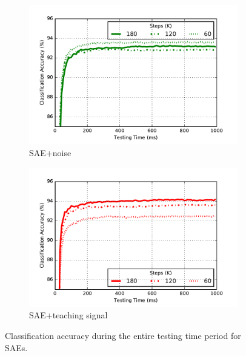 \begin{figure}
\begin{subfigure}[t]{0.4\textwidth}
		\includegraphics[width=\textwidth]{pics_sdlm/noise_ae/latency.pdf}
		\caption{SAE+noise}
	\end{subfigure}
	\begin{subfigure}[t]{0.4\textwidth}
		\includegraphics[width=\textwidth]{pics_sdlm/43_MNIST_SAE_all/latency.pdf}
		\caption{SAE+teaching signal}
	\end{subfigure}
	\caption{Classification accuracy during the entire testing time period for SAEs.}
\end{figure}


